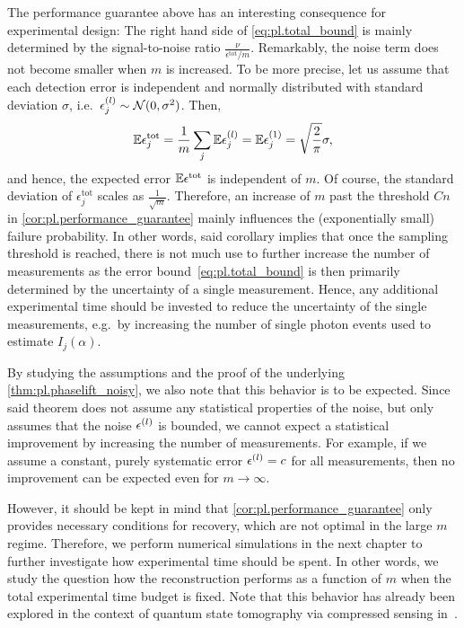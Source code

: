 The performance guarantee above has an interesting consequence for experimental design:
The right hand side of \cref{eq:pl.total_bound} is mainly determined by the signal-to-noise ratio $\frac{\nu}{\epsilon^\mathrm{tot} / m}$.
Remarkably, the noise term does not become smaller when $m$ is increased.
To be more precise, let us assume that each detection error  is independent and normally distributed with standard deviation $\sigma$, i.e.\ $\epsilon^{(l)}_j \sim \mathcal{N}(0, \sigma^2)$.
Then,
\[
  \mathbb{E} \epsilon^\mathrm{tot}_j = \frac{1}{m} \sum_j \mathbb{E} \epsilon^{(l)}_j = \mathbb{E} \epsilon^{(1)}_j = \sqrt{\frac{2}{\pi}} \sigma,
\]
and hence, the expected error $\mathbb{E} \epsilon^\mathrm{tot}$ is independent of $m$.
Of course, the standard deviation of $\epsilon^\mathrm{tot}_j$ scales as $\frac{1}{\sqrt{m}}$.
Therefore, an increase of $m$ past the threshold $Cn$ in \cref{cor:pl.performance_guarantee} mainly influences the (exponentially small) failure probability.
In other words, said corollary implies that once the sampling threshold is reached, there is not much use to further increase the number of measurements as the error bound~\eqref{eq:pl.total_bound} is then primarily determined by the uncertainty of a single measurement.
Hence, any additional experimental time should be invested to reduce the uncertainty of the single measurements, e.g.\ by increasing the number of single photon events used to estimate $I_j(\alpha)$.

By studying the assumptions and the proof of the underlying \cref{thm:pl.phaselift_noisy}, we also note that this behavior is to be expected.
Since said theorem does not assume any statistical properties of the noise, but only assumes that the noise $\epsilon^{(l)}$ is bounded, we cannot expect a statistical improvement by increasing the number of measurements.
For example, if we assume a constant, purely systematic error $\epsilon^{(l)} = c$ for all measurements, then no improvement can be expected even for $m\to\infty$.

However, it should be kept in mind that \cref{cor:pl.performance_guarantee} only provides necessary conditions for recovery, which are not optimal in the large $m$ regime.
Therefore, we perform numerical simulations in the next chapter to further investigate how experimental time should be spent.
In other words, we study the question how the reconstruction performs as a function of $m$ when the total experimental time budget is fixed.
Note that this behavior has already been explored in the context of quantum state tomography via compressed sensing in~\cite{Flammia_2012_Quantum}.


